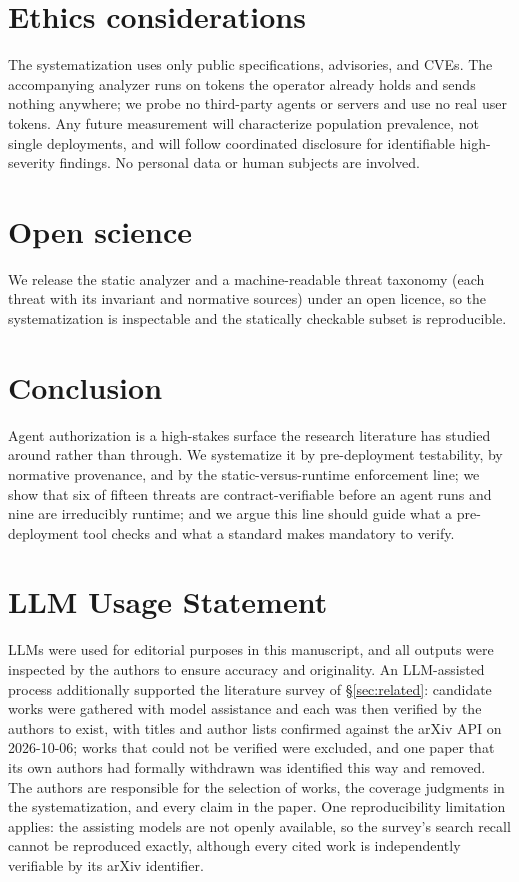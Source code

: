 \section*{Ethics considerations}
The systematization uses only public specifications, advisories, and CVEs. The
accompanying analyzer runs on tokens the operator already holds and sends nothing
anywhere; we probe no third-party agents or servers and use no real user tokens. Any
future measurement will characterize population prevalence, not single deployments,
and will follow coordinated disclosure for identifiable high-severity findings. No
personal data or human subjects are involved.

\section*{Open science}
We release the static analyzer and a machine-readable threat taxonomy (each threat
with its invariant and normative sources) under an open licence, so the
systematization is inspectable and the statically checkable subset is reproducible.

\section{Conclusion}
Agent authorization is a high-stakes surface the research literature has studied
around rather than through. We systematize it by pre-deployment testability, by
normative provenance, and by the static-versus-runtime enforcement line; we show that
six of fifteen threats are contract-verifiable before an agent runs and nine are
irreducibly runtime; and we argue this line should guide what a pre-deployment tool
checks and what a standard makes mandatory to verify.

\section*{LLM Usage Statement}
LLMs were used for editorial purposes in this manuscript, and all outputs were
inspected by the authors to ensure accuracy and originality. An LLM-assisted process
additionally supported the literature survey of \S\ref{sec:related}: candidate works
were gathered with model assistance and each was then verified by the authors to
exist, with titles and author lists confirmed against the arXiv API on 2026-10-06;
works that could not be verified were excluded, and one paper that its own authors had
formally withdrawn was identified this way and removed. The authors are responsible
for the selection of works, the coverage judgments in the systematization, and every
claim in the paper. One reproducibility limitation applies: the assisting models are
not openly available, so the survey's search recall cannot be reproduced exactly,
although every cited work is independently verifiable by its arXiv identifier.

